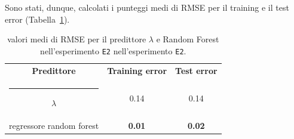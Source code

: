 \documentclass[12pt]{report}
\makeatletter
\theoremstyle{definition}
\newcommand{\thickhline}{%
    \noalign {\ifnum 0=`}\fi \hrule height 1pt
    \futurelet \reserved@a \@xhline
}
\makeatother
\begin{document}
Sono stati, dunque, calcolati i punteggi medi di RMSE per il training e il test error (Tabella~\ref{rmse_exp2}). 
\begin{table}
\centering
\begin{adjustbox}{max width=\textwidth}
 \begin{tabular}{|c|c|c|} 
 \hline
\textbf{Predittore} & \textbf{Training error} & \textbf{Test error}
\\ [0.5ex] 
 \thickhline
 $\lambda$ & 0.14 & 0.14 \\
 regressore random forest & \textbf{0.01} & \textbf{0.02}
 \\
 \hline
\end{tabular}
\end{adjustbox}
\caption{valori medi di RMSE per il predittore $\lambda$ e Random Forest nell'esperimento \texttt{E2} nell'esperimento \texttt{E2}.}
\label{rmse_exp2}
\end{table}
\end{document}
